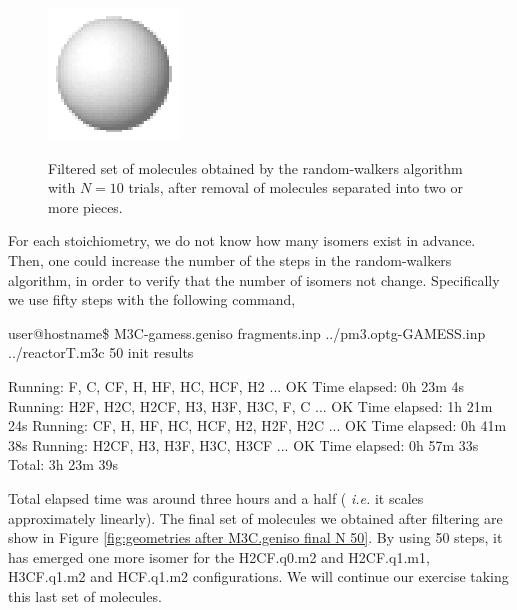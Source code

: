 \documentclass[a4paper,12pt]{article}
\newcounter{cline}
\newcommand{\ttiny}{\ttfamily\fontsize{7pt}{8pt}\selectfont}
\begin{document}
\begin{figure}[ht]
\begin{tabular}
\includegraphics[scale=0.3]{images/table2/H.q1.m0-1.eps} \ttiny{28 \hspace{5pt} H.q1.m0-1} 
\\
\end{tabular}
\caption{\footnotesize{
Filtered set of molecules obtained by the random-walkers algorithm with $N=10$ trials, after removal of molecules 
separated into two or more pieces.
}}
\label{fig:geometries after M3C.geniso final}
\end{figure}


For each stoichiometry, we do not know how many isomers exist in advance. Then, one could
increase the number of the steps in the random-walkers algorithm, in order to verify that the number of 
isomers not change. Specifically we use fifty steps with the following command,

\begin{shellexec}
user@hostname\$ M3C-gamess.geniso fragments.inp ../pm3.optg-GAMESS.inp ../reactorT.m3c 50 init results

Running:    F,   C,   CF,   H,   HF,  HC, HCF,  H2 ... OK   Time elapsed: 0h 23m  4s
Running:  H2F, H2C, H2CF,  H3,  H3F, H3C,   F,   C ... OK   Time elapsed: 1h 21m 24s
Running:   CF,   H,   HF,  HC,  HCF,  H2, H2F, H2C ... OK   Time elapsed: 0h 41m 38s
Running: H2CF,  H3,  H3F, H3C, H3CF                ... OK   Time elapsed: 0h 57m 33s
                                                                   Total: 3h 23m 39s
\end{shellexec}
Total elapsed time was around three hours and a half ( \textit{i.e.} it scales approximately linearly). The final set of
molecules we obtained after filtering
are show in Figure \ref{fig:geometries after M3C.geniso final N 50}. By using 50 steps,
it has emerged one more isomer for the H2CF.q0.m2 and H2CF.q1.m1, H3CF.q1.m2 and HCF.q1.m2 configurations.
We will continue our exercise taking this last set of molecules.

\end{document}
